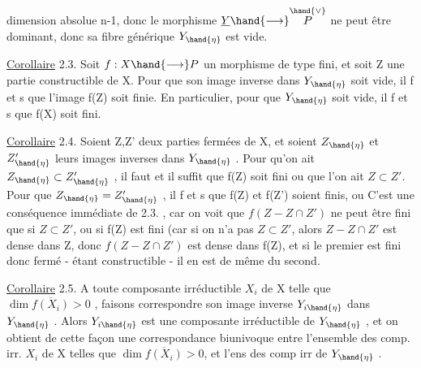 
dimension absolue n-1, donc le morphisme $\underline{Y}\hand{\longrightarrow} \overset{\hand{\vee}}{P}$ ne peut être dominant,
donc sa fibre générique $Y_{\hand{\eta}}$ est vide.

\uline{Corollaire} 2.3. Soit $f:X\hand{\longrightarrow} P$ un morphisme de type fini, et soit Z une
partie constructible de X. Pour que son image inverse dans $Y_{\hand{\eta}}$ soit vide,
il f et s que l'image f(Z) soit finie. En particulier, pour que  $Y_{\hand{\eta}}$ soit
vide, il f et s que f(X) soit fini.

\uline{Corollaire} 2.4. Soient Z,Z' deux parties fermées  de X,
et soient $Z_{\hand{\eta}}$ et $Z'_{\hand{\eta}}$ leurs images inverses dans $Y_{\hand{\eta}}$ . Pour qu'on ait
$Z_{\hand{\eta}}\subset Z'_{\hand{\eta}}$ , il faut et il suffit que f(Z) soit fini ou que l'on ait $Z\subset Z'$.
Pour que $Z_{\hand{\eta}} = Z'_{\hand{\eta}}$ , il f et s que  f(Z) et f(Z') soient finis, ou 
 C'est une conséquence 
 immédiate de 2.3. , car on voit que $f(Z - Z\cap Z')$ ne peut être fini
que si $Z\subset Z'$, ou si f(Z) est fini (car si on n'a pas $Z\subset Z'$, alors $Z-Z\cap Z'$
est dense dans Z, donc $f(Z-Z\cap Z')$ est dense dans f(Z), et si le premier
est fini donc fermé - étant constructible - il en est de même du second.

\uline{Corollaire} 2.5. A toute composante irréductible $X_i$ de X telle que
$\dim \overline{f(X_i)} > 0$ , faisons correspondre  son image inverse $Y_{i\hand{\eta}}$ dans
$Y_{\hand{\eta}}$ . Alors $Y_{i\hand{\eta}}$ est une composante irréductible de $Y_{\hand{\eta}}$ , et on obtient de
cette façon une correspondance biunivoque entre l'ensemble des comp. irr.
$X_i$ de X telles que $\dim \overline{f(X_i)}> 0$, et l'ens des comp irr de $Y_{\hand{\eta}}$ .

